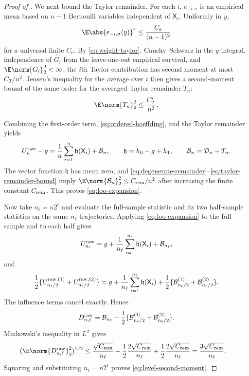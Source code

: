 \begin{proof}[Proof of ]
We next bound the Taylor remainder.  For each $i$, $e_{-i,\sigma}$ is an empirical mean based on $n-1$ Bernoulli variables independent of $\mathsf X_i$.  Uniformly in $y$,
\begin{equation}\label{eq:bernoulli-fourth-moment}
 \E\abs{e_{-i,\sigma}(y)}^4\le\frac{C_e}{(n-1)^2}
\end{equation}
for a universal finite $C_e$.  By \eqref{eq:weight-taylor}, Cauchy--Schwarz in the $y$-integral, independence of $G_i$ from the leave-one-out empirical survival, and $\E\norm{G_i}_2^2<\infty$, the $i$th Taylor contribution has second moment at most $C_T/n^2$.  Jensen's inequality for the average over $i$ then gives a second-moment bound of the same order for the averaged Taylor remainder $T_n$:
\begin{equation}\label{eq:taylor-remainder-bound}
 \E\norm{T_n}_2^2\le\frac{C_T'}{n^2}.
\end{equation}

Combining the first-order term, \eqref{eq:ordered-hoeffding}, and the Taylor remainder yields
\[
 U_n^{\rm raw}-g
 =\frac1n\sum_{i=1}^{n}\mathfrak h(\mathsf X_i)+\mathcal B_n,
 \qquad
 \mathfrak h=h_0-g+h_1,
 \qquad
 \mathcal B_n=\mathcal D_n+T_n.
\]
The vector function $\mathfrak h$ has mean zero, and \eqref{eq:degenerate-remainder}--\eqref{eq:taylor-remainder-bound} imply
$\E\norm{\mathcal B_n}_2^2\le C_{\rm rem}/n^2$ after increasing the finite constant $C_{\rm rem}$.  This proves \eqref{eq:loo-expansion}.

Now take $n_\ell=n2^\ell$ and evaluate the full-sample statistic and its two half-sample statistics on the same $n_\ell$ trajectories.  Applying \eqref{eq:loo-expansion} to the full sample and to each half gives
\[
 U_{n_\ell}^{\rm raw}
 =g+\frac1{n_\ell}\sum_{i=1}^{n_\ell}\mathfrak h(\mathsf X_i)+\mathcal B_{n_\ell},
\]
and
\[
 \frac12\{U_{n_\ell/2}^{\rm raw,(1)}+U_{n_\ell/2}^{\rm raw,(2)}\}
 =g+\frac1{n_\ell}\sum_{i=1}^{n_\ell}\mathfrak h(\mathsf X_i)
 +\frac12\{\mathcal B_{n_\ell/2}^{(1)}+\mathcal B_{n_\ell/2}^{(2)}\}.
\]
The influence terms cancel exactly.  Hence
\[
 D_{n,\ell}^{\rm raw}
 =\mathcal B_{n_\ell}-\frac12\{\mathcal B_{n_\ell/2}^{(1)}+\mathcal B_{n_\ell/2}^{(2)}\}.
\]
Minkowski's inequality in $L^2$ gives
\begin{align*}
 (\E\norm{D_{n,\ell}^{\rm raw}}_2^2)^{1/2}
 &\le\frac{\sqrt{C_{\rm rem}}}{n_\ell}
 +\frac12\frac{2\sqrt{C_{\rm rem}}}{n_\ell}
 +\frac12\frac{2\sqrt{C_{\rm rem}}}{n_\ell}
 =\frac{3\sqrt{C_{\rm rem}}}{n_\ell}.
\end{align*}
Squaring and substituting $n_\ell=n2^\ell$ proves \eqref{eq:level-second-moment}.


\end{proof}

